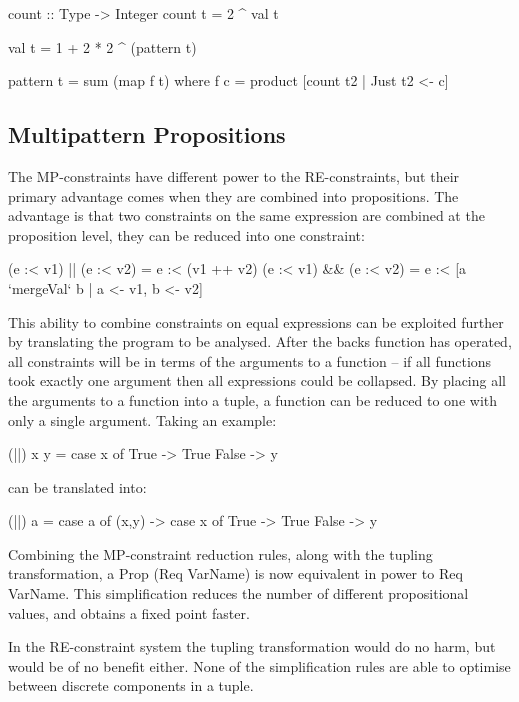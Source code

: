 \documentclass[preprint]{sigplanconf}
\newcommand{\C}[1]{\textsf{#1}}
\begin{document}
\begin{code}
count :: Type -> Integer
count t = 2 ^ val t

val t = 1 + 2 * 2 ^ (pattern t)

pattern t = sum (map f t)
    where f c = product [count t2 | Just t2 <- c]
\end{code}


\subsection{Multipattern Propositions}

The MP-constraints have different power to the RE-constraints, but their primary advantage comes when they are combined into propositions. The advantage is that two constraints on the same expression are combined at the proposition level, they can be reduced into one constraint:

\begin{code}
(e :< v1) || (e :< v2) = e :< (v1 ++ v2)
(e :< v1) && (e :< v2) = e :< [a `mergeVal` b | a <- v1, b <- v2]
\end{code}

This ability to combine constraints on equal expressions can be exploited further by translating the program to be analysed. After the \C{backs} function has operated, all constraints will be in terms of the arguments to a function -- if all functions took exactly one argument then all expressions could be collapsed. By placing all the arguments to a function into a tuple, a function can be reduced to one with only a single argument. Taking an example:

\begin{code}
(||) x y = case  x of
                 True   -> True
                 False  -> y
\end{code}

\noindent can be translated into:

\begin{code}
(||) a = case  a of
               (x,y) -> case  x of
                              True    -> True
                              False   -> y
\end{code}

Combining the MP-constraint reduction rules, along with the tupling transformation, a \C{Prop (Req VarName)} is now equivalent in power to \C{Req VarName}. This simplification reduces the number of different propositional values, and obtains a fixed point faster.

In the RE-constraint system the tupling transformation would do no harm, but would be of no benefit either. None of the simplification rules are able to optimise between discrete components in a tuple.
\end{document}
